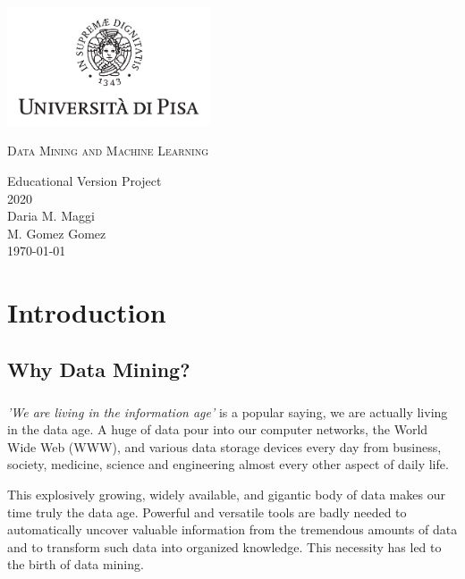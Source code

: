 \documentclass{book}
\author{Daria Margherita Maggi & Marsha Gomez Gomez}
\date{\today}
\begin{document}
    \begin{titlepage}
        \centering
        \includegraphics[width=6cm]{unipi}
        \vfill
        \vspace{1.5cm}
        {\huge\textsc{Data Mining and Machine Learning}\par}
        {\Large
            Educational Version Project\\
            2020\\
            \vspace{2cm}
            Daria M. Maggi\\
            M. Gomez Gomez\\
            \vspace{2cm}
            \today
        }    
        \vfill
        \vfill
    \end{titlepage}
    
    \tableofcontents


\chapter{Introduction}
    \section{Why Data Mining?}
    \paragraph{}
    \textit{'We are living in the information age'} is a popular saying, we are actually living in the data age. A huge of data pour into our computer networks, the World Wide Web (WWW), and various data storage devices every day from business, society, medicine, science and engineering almost every other aspect of daily life. 
    
    This explosively growing, widely available, and gigantic body of data makes our time truly the data age. Powerful and versatile tools are badly needed to automatically uncover valuable information from the tremendous amounts of data and to transform such data into organized knowledge. This necessity has led to the birth of data mining.
\end{document}
